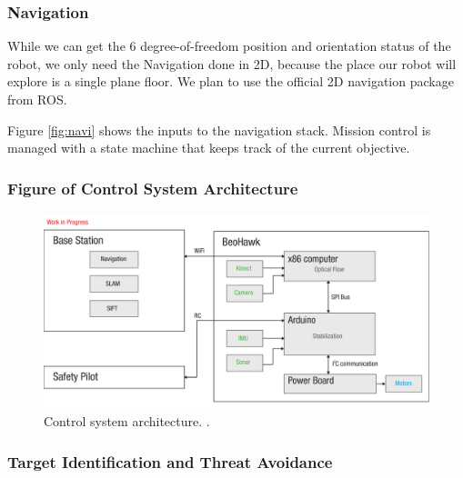\documentclass[12pt, letterpaper]{article}
\begin{document}

\subsubsection{Navigation}

While we can get the 6 degree-of-freedom position and orientation status of the robot, we only need the Navigation done in 2D, because the place our robot will explore is a single plane floor. We plan to use the official 2D navigation package from ROS.


Figure \eqref{fig:navi} shows the inputs to the navigation stack. Mission control is managed with a state machine that keeps track of the current objective.  

\subsubsection{Figure of Control System Architecture}

\begin{figure}[h]
\centering
\includegraphics[width=14cm]{images/beohawk-system-arch.pdf}
\caption{Control system architecture. .} 
\label{fig:architecture}
\end{figure}


\subsubsection{Target Identification and Threat Avoidance}
\end{document}
